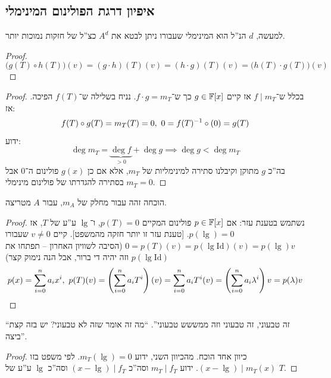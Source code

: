 \documentclass[]{../../../../tex/classes/styledArticle}
\begin{document}
    \subsection*{איפיון דרגת הפולינום המינימלי}
    למעשה, $d$ הנ''ל הוא המינימלי שעבורו ניתן לבטא את $A^{d}$ כצ''ל של חזקות נמוכות יותר. 
    \begin{proof}
        \[ \big(g(T) \circ h(T)\big)(v) = (g \cdot h)(T)(v) = (h \cdot g)(T)(v) = \big(h(T) \cdot g(T) \big)(v) \]
    \end{proof}
    
    \begin{proof}
        בכלל ש־$f \mid m_T$ אז קיים $g\in \mathbb{F}[x]$ כך ש־$f \cdot g = m_T$. נניח בשלילה ש־$f(T)$ הפיכה. אז: 
        \[ f(T) \circ g(T) = m_T(T) = 0, \ 0 = f(T)\op \circ (0) = g(T) \]
        ידוע: 
        \[ \deg m_T = \underbrace{\deg f}_{>0} + \deg g \implies \deg g< \deg m_T \]
        בה''כ $g$ מתוקן וקיבלנו סתירה למינימליות של $m_T$, אלא אם כן $g(x)$ פולינום ה־$0$ אבל $m_T = 0$ בסתירה להגדרתו של פולינום מינימלי. 
    \end{proof}
    הוכחה זהה עבור מחלק של $m_A$, עבור $A$ מטריצה. 
    \begin{proof}
        נשתמש בטענת עזר: אם $p \in \mathbb{F}[x]$ פולינום המקיים $p(T) = 0$, ו־$\lg$ ע''ע של $T$, אז $p(\lg) = 0$. [טענת עזר זו יותר חזקה מהמשפט]. קיים $v \neq 0$ שעבורו $0 = p(T)(v) = p(\lg \mathrm{Id})(v) = p(\lg)v$ (הסיבה לשוויון האחרון – תפתחו את $p(\lg \mathrm{Id})$ וזה יהיה די ברור, אבל הנה נימוק קצר)
        \[ p(x) = \sum_{i = 0}^{n}a_ix^i, \ p(T)(v) = \left ( \sum_{i = 0}^{n}a_iT^{i} \right )\left ( v \right ) = \sum_{i = 0}^{n}a_iT^{i}(v) = \left ( \sum_{i = 0}^{n}a_i\lambda^i \right )v = p(\lambda)v \] 
    \end{proof}
    ``זה טבעוני, זה טבעוני וזה ממששש טבעוני''. ``מה זה אומר שזה לא טבעוני? יש בזה קצת ביצה''. 
     \begin{proof}
        כיוון אחד הוכח. מהכיוון השני, ידוע $m_T(\lg) = 0$. לפי משפט בזו $(x - \lg) \mid m_T(x)$. ידוע $m_T \mid f_T$ וסה''כ $(x - \lg) \mid f_T$ וסה''כ $\lg$ ע''ע של $T$. 
    \end{proof}
    
\end{document}
